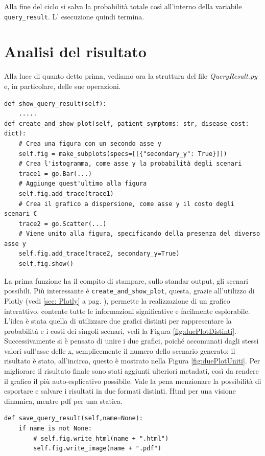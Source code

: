 Alla fine del ciclo si salva la probabilità totale così all'interno della variabile\\ \texttt{query_result}. L' esecuzione quindi termina.

\section{Analisi del risultato}
Alla luce di quanto detto prima, vediamo ora la struttura del file \emph{QueryResult.py} e, 
in particolare, delle sue operazioni.
\begin{verbatim}
def show_query_result(self):
	.....
def create_and_show_plot(self, patient_symptoms: str, disease_cost: dict):
	# Crea una figura con un secondo asse y
	self.fig = make_subplots(specs=[[{"secondary_y": True}]])
	# Crea l'istogramma, come asse y la probabilità degli scenari
	trace1 = go.Bar(...)
	# Aggiunge quest'ultimo alla figura
	self.fig.add_trace(trace1)
	# Crea il grafico a dispersione, come asse y il costo degli scenari €
	trace2 = go.Scatter(...)
	# Viene unito alla figura, specificando della presenza del diverso asse y
	self.fig.add_trace(trace2, secondary_y=True)	
	self.fig.show()
\end{verbatim}
La prima funzione ha il compito di stampare, sullo standar output, gli scenari possibili.
Più interessante è \texttt{create_and_show_plot}, questa, grazie all'utilizzo di
Plotly (vedi \ref{sec: Plotly} a pag. \pageref{sec: Plotly}), permette la realizzazione di un grafico
interattivo, contente tutte le informazioni significative e facilmente esplorabile.
L'idea è stata quella di utilizzare due grafici distinti per rappresentare la probabilità e 
i costi dei singoli scenari, vedi la Figura \ref{fig:duePlotDistinti}.
Successivamente si è pensato di unire i due grafici, poiché accomunati dagli stessi valori sull'asse delle x,
semplicemente il numero dello scenario generato; il risultato è stato, all'incirca, questo è mostrato
nella Figura \ref{fig:duePlotUniti}.
Per migliorare il risultato finale sono stati aggiunti ulteriori metadati, così da rendere il grafico
il più auto-esplicativo possibile. Vale la pena menzionare la possibilità di esportare e salvare i risultati
in due formati distinti. Html per una visione dinamica, mentre pdf per una statica.
\begin{verbatim}
def save_query_result(self,name=None):
	if name is not None:
		# self.fig.write_html(name + ".html")
		self.fig.write_image(name + ".pdf")
\end{verbatim}
